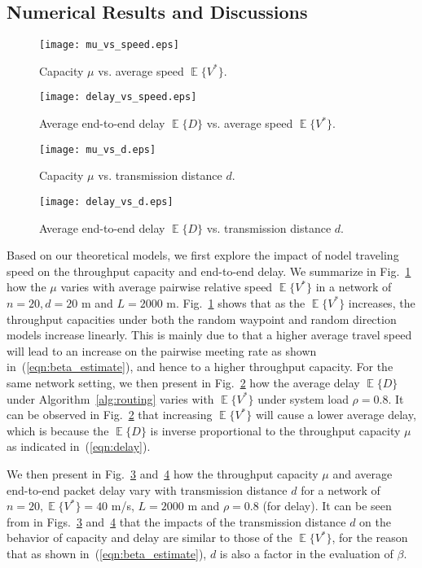 \documentclass[twocolumn, 10pt]{svjour3}         \smartqed  \usepackage{graphicx}
\DeclareMathOperator*{\E}{\mathbb{E}}
\begin{document}
\subsection{Numerical Results and Discussions}


\begin{figure}
	\centering
		\texttt{[image: mu\_vs\_speed.eps]}
		\caption{Capacity $\mu$ vs. average speed $\E\{V^*\}$.}
	\label{fig:mu_vs_speed}
\end{figure}
\begin{figure}
	\centering
		\texttt{[image: delay\_vs\_speed.eps]}
		\caption{Average end-to-end delay $\E\{D\}$   vs. average speed $\E\{V^*\}$.}
	\label{fig:delay_vs_speed}
\end{figure}
\begin{figure}
	\centering
		\texttt{[image: mu\_vs\_d.eps]}
		\caption{Capacity $\mu$ vs. transmission distance $d$.}
	\label{fig:mu_vs_d}
\end{figure}
\begin{figure}
	\centering
		\texttt{[image: delay\_vs\_d.eps]}
		\caption{Average end-to-end delay $\E\{D\}$ vs. transmission distance $d$.}
	\label{fig:delay_vs_d}
\end{figure}


Based on our theoretical models, we first explore the impact of nodel traveling speed on the throughput capacity and end-to-end delay. 
We summarize in Fig.~\ref{fig:mu_vs_speed}  how the $\mu$ varies with average pairwise relative speed  $\E\{V^*\}$ in a network of $n = 20, d = 20$ m and $L=2000$ m.
Fig.~\ref{fig:mu_vs_speed}  shows that as the $\E\{V^*\}$ increases, the throughput capacities under  both the random waypoint and random direction models increase linearly.
This is mainly due to that a higher average travel speed will lead to an increase on the pairwise meeting rate as shown in~(\ref{eqn:beta_estimate}), and hence to a higher throughput capacity.
For the same network setting, we then present in Fig.~\ref{fig:delay_vs_speed} how the average delay $\E\{D\}$ under Algorithm~\ref{alg:routing} varies with $\E\{V^*\}$ under system load $\rho = 0.8$.
It can be observed in Fig.~\ref{fig:delay_vs_speed} that increasing $\E\{V^*\}$ will cause a lower average delay, which is because the $\E\{D\}$ is inverse proportional to the throughput capacity $\mu$ as indicated in~(\ref{eqn:delay}).


We then present in Fig.~\ref{fig:mu_vs_d} and~\ref{fig:delay_vs_d} how the throughput capacity $\mu$ and average end-to-end packet delay vary with transmission distance $d$ for a network of $n = 20, \E\{V^*\} = 40$ m/s, $L=2000$ m and $\rho = 0.8$ (for delay).
It can be seen from in Figs.~\ref{fig:mu_vs_d} and~\ref{fig:delay_vs_d} that the impacts  of the transmission distance $d$ on the behavior of capacity and delay are similar to those of the $\E\{V^*\}$, for the reason that as shown in~(\ref{eqn:beta_estimate}),  $d$ is also  a factor in the evaluation of $\beta$.
\end{document}
